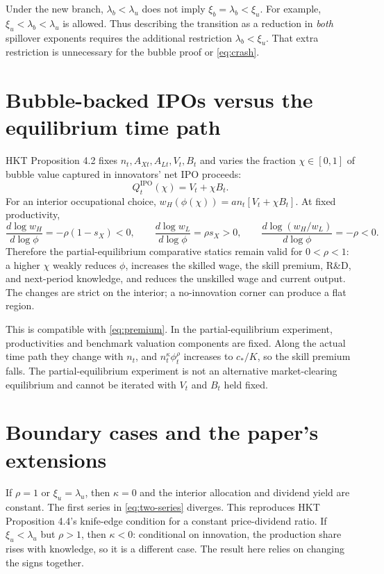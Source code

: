 \documentclass[11pt,a4paper]{article}
\begin{document}
Under the new branch, $\lambda_b<\lambda_u$ does not imply
$\xi_b=\lambda_b<\xi_u$. For example, $\xi_u<\lambda_b<\lambda_u$ is allowed.
Thus describing the transition as a reduction in \emph{both} spillover
exponents requires the additional restriction $\lambda_b<\xi_u$. That extra
restriction is unnecessary for the bubble proof or \eqref{eq:crash}.

\section{Bubble-backed IPOs versus the equilibrium time path}
HKT Proposition 4.2 fixes $n_t,A_{Xt},A_{Lt},V_t,B_t$ and varies the fraction
$\chi\in[0,1]$ of bubble value captured in innovators' net IPO proceeds:
\begin{equation}
Q_t^{\mathrm{IPO}}(\chi)=V_t+\chi B_t.
\end{equation}
For an interior occupational choice,
$w_H(\phi(\chi))=an_t[V_t+\chi B_t]$. At fixed productivity,
\begin{equation}
\frac{d\log w_H}{d\log\phi}=-\rho(1-s_X)<0,
\qquad
\frac{d\log w_L}{d\log\phi}=\rho s_X>0,
\qquad
\frac{d\log(w_H/w_L)}{d\log\phi}=-\rho<0.
\end{equation}
Therefore the partial-equilibrium comparative statics remain valid for
$0<\rho<1$: a higher $\chi$ weakly reduces $\phi$, increases the skilled wage,
the skill premium, R\&D, and next-period knowledge, and reduces the unskilled
wage and current output. The changes are strict on the interior; a
no-innovation corner can produce a flat region.

This is compatible with \eqref{eq:premium}. In the partial-equilibrium
experiment, productivities and benchmark valuation components are fixed. Along
the actual time path they change with $n_t$, and $n_t^\kappa\phi_t^\rho$
increases to $c_*/K$, so the skill premium falls. The partial-equilibrium
experiment is not an alternative market-clearing equilibrium and cannot be
iterated with $V_t$ and $B_t$ held fixed.

\section{Boundary cases and the paper's extensions}
If $\rho=1$ or $\xi_u=\lambda_u$, then $\kappa=0$ and the interior allocation
and dividend yield are constant. The first series in \eqref{eq:two-series}
diverges. This reproduces HKT Proposition 4.4's knife-edge condition for a
constant price-dividend ratio. If $\xi_u<\lambda_u$ but $\rho>1$, then
$\kappa<0$: conditional on innovation, the production share rises with
knowledge, so it is a different case. The result here relies on changing the
signs together.
\end{document}
